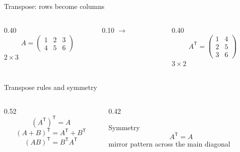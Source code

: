 \begin{frame}{Transpose: rows become columns}
  \begin{columns}[T,onlytextwidth]
    \begin{column}{0.40\textwidth}
      \[
      A=\begin{pmatrix}1&2&3\\4&5&6\end{pmatrix}
      \]
      \centering $2\times3$
    \end{column}
    \begin{column}{0.10\textwidth}
      \centering\vspace{0.85cm}\Large $\longrightarrow$
    \end{column}
    \begin{column}{0.40\textwidth}
      \[
      A^{\mathsf T}=\begin{pmatrix}1&4\\2&5\\3&6\end{pmatrix}
      \]
      \centering $3\times2$
    \end{column}
  \end{columns}
\end{frame}

\begin{frame}{Transpose rules and symmetry}
  \begin{columns}[T,onlytextwidth]
    \begin{column}{0.52\textwidth}
      \[
      (A^{\mathsf T})^{\mathsf T}=A
      \]
      \[
      (A+B)^{\mathsf T}=A^{\mathsf T}+B^{\mathsf T}
      \]
      \[
      (AB)^{\mathsf T}=B^{\mathsf T}A^{\mathsf T}
      \]
    \end{column}
    \begin{column}{0.42\textwidth}
      \begin{exampleblock}{Symmetry}
        \[
        A^{\mathsf T}=A
        \]
        mirror pattern across the main diagonal
      \end{exampleblock}
    \end{column}
  \end{columns}
\end{frame}

